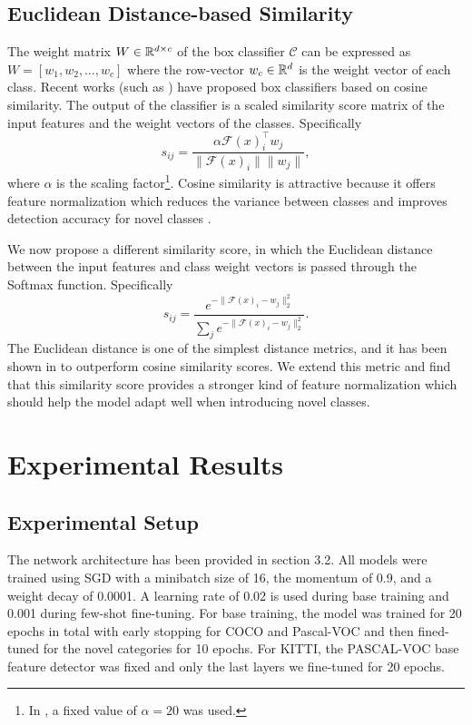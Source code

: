 \documentclass{article}
\begin{document}
\subsection{Euclidean Distance-based Similarity}
The weight matrix $W \in \mathbb{R}^{d \times c}$ of the box classifier $\mathcal{C}$ can be expressed as 
  $W = [w_1, w_2, \dots, w_c]$ 
where the row-vector  $w_c \in \mathbb{R}^d$ is the weight vector of each class.  
Recent works (such as \cite{VinyalsBLKW16,chen2019closer,qi2018low,gidaris2018dynamic}) have proposed 
box classifiers based on cosine similarity. The output of the classifier is a scaled similarity score matrix 
of the input features and the weight vectors of the classes. Specifically
\begin{equation}
  s_{ij} = \frac{\alpha \mathcal{F}(x)_i^\top w_j}{\| \mathcal{F}(x)_i \| \|w_j\|},
\end{equation}
where $\alpha$ is the scaling factor\footnote{In \cite{wang2020frustratingly}, a fixed value 
of $\alpha = 20$ was used.}. 
Cosine similarity is attractive because it offers feature normalization which reduces the 
variance between classes and improves detection accuracy for novel classes \cite{wang2020frustratingly}. 

We now propose a different similarity score, in which the Euclidean distance between the 
input features and class weight vectors is passed through the Softmax function. Specifically
\begin{equation}
  s_{ij} = \frac{e^{-\|\mathcal{F}(x)_i - w_j\|_2^2}}{\sum_{j} e^{-\|\mathcal{F}(x)_i - w_j\|_2^2}}.
\end{equation}
The Euclidean distance is one of the simplest distance metrics, and it has been shown in \cite{snell2017prototypical} 
to outperform cosine similarity scores. 
We extend this metric and find that this similarity score provides a stronger kind of feature normalization 
which should help the model adapt well when introducing novel classes. 

\section{Experimental Results}
\subsection{Experimental Setup}
The network architecture has been provided in section 3.2. All models were trained using SGD with a minibatch size of 16, the momentum of 0.9, and a weight decay of 0.0001. A learning rate of 0.02 is used during base training and 0.001 during few-shot fine-tuning. For base training, the model was trained for 20 epochs in total with early stopping for COCO and Pascal-VOC and then fined-tuned for the novel categories for 10 epochs. For KITTI, the PASCAL-VOC base feature detector was fixed and only the last layers we fine-tuned for 20 epochs.
\end{document}
